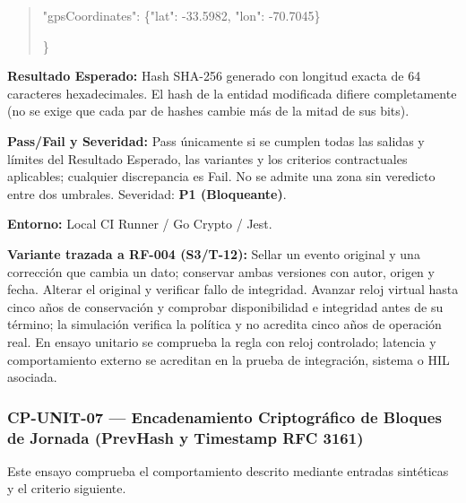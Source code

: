\begin{quote}
    "\allowbreak{}g\allowbreak{}p\allowbreak{}s\allowbreak{}C\allowbreak{}o\allowbreak{}o\allowbreak{}r\allowbreak{}d\allowbreak{}i\allowbreak{}n\allowbreak{}a\allowbreak{}t\allowbreak{}e\allowbreak{}s\allowbreak{}"\allowbreak{}:\allowbreak{} \{\allowbreak{}"\allowbreak{}l\allowbreak{}a\allowbreak{}t\allowbreak{}"\allowbreak{}:\allowbreak{} -\allowbreak{}3\allowbreak{}3\allowbreak{}.\allowbreak{}5\allowbreak{}9\allowbreak{}8\allowbreak{}2\allowbreak{},\allowbreak{} "\allowbreak{}l\allowbreak{}o\allowbreak{}n\allowbreak{}"\allowbreak{}:\allowbreak{} -\allowbreak{}7\allowbreak{}0\allowbreak{}.\allowbreak{}7\allowbreak{}0\allowbreak{}4\allowbreak{}5\allowbreak{}\}\allowbreak{}\par
  \}\allowbreak{}\par
\end{quote}
\par\noindent\textbf{Resultado Esperado:} Hash SHA-256 generado con longitud exacta de 64 caracteres hexadecimales. El hash de la entidad modificada difiere completamente (no se exige que cada par de hashes cambie más de la mitad de sus bits).\par
\par\noindent\textbf{Pass/Fail y Severidad:} Pass únicamente si se cumplen todas las salidas y límites del Resultado Esperado, las variantes y los criterios contractuales aplicables; cualquier discrepancia es Fail. No se admite una zona sin veredicto entre dos umbrales. Severidad: \textbf{P1 (Bloqueante)}.\par
\par\noindent\textbf{Entorno:} Local CI Runner / Go Crypto / Jest.\par







\par\noindent\textbf{Variante trazada a RF-004 (S3/T-12):} Sellar un evento original y una corrección que cambia un dato; conservar ambas versiones con autor, origen y fecha. Alterar el original y verificar fallo de integridad. Avanzar reloj virtual hasta cinco años de conservación y comprobar disponibilidad e integridad antes de su término; la simulación verifica la política y no acredita cinco años de operación real. En ensayo unitario se comprueba la regla con reloj controlado; latencia y comportamiento externo se acreditan en la prueba de integración, sistema o HIL asociada.\par
\subsubsection*{CP-UNIT-07 — Encadenamiento Criptográfico de Bloques de Jornada (PrevHash y Timestamp RFC 3161)}\label{sec:9-cp-unit-07}
Este ensayo comprueba el comportamiento descrito mediante entradas sintéticas y el criterio siguiente.

